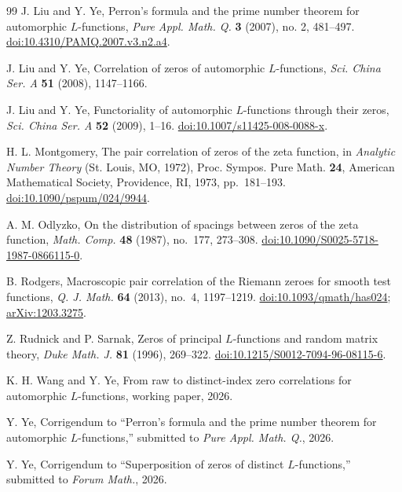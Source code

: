 \documentclass[11pt]{article}
\numberwithin{equation}{section}
\theoremstyle{remark}
\begin{document}
\begin{thebibliography}{99}
J. Liu and Y. Ye, Perron's formula and the prime number theorem for
automorphic $L$-functions, \textit{Pure Appl. Math. Q.} \textbf{3}
(2007), no. 2, 481--497.
\href{https://doi.org/10.4310/PAMQ.2007.v3.n2.a4}{doi:10.4310/PAMQ.2007.v3.n2.a4}.

J. Liu and Y. Ye, Correlation of zeros of automorphic $L$-functions,
\textit{Sci. China Ser. A} \textbf{51} (2008), 1147--1166.

J. Liu and Y. Ye, Functoriality of automorphic $L$-functions through
their zeros, \textit{Sci. China Ser. A} \textbf{52} (2009), 1--16.
\href{https://doi.org/10.1007/s11425-008-0088-x}{doi:10.1007/s11425-008-0088-x}.

H. L. Montgomery,
The pair correlation of zeros of the zeta function,
in \emph{Analytic Number Theory} (St. Louis, MO, 1972),
Proc. Sympos. Pure Math. \textbf{24},
American Mathematical Society, Providence, RI, 1973, pp.~181--193.
\href{https://doi.org/10.1090/pspum/024/9944}{doi:10.1090/pspum/024/9944}.

A. M. Odlyzko,
On the distribution of spacings between zeros of the zeta function,
\emph{Math. Comp.} \textbf{48} (1987), no.~177, 273--308.
\href{https://doi.org/10.1090/S0025-5718-1987-0866115-0}{doi:10.1090/S0025-5718-1987-0866115-0}.

B. Rodgers,
Macroscopic pair correlation of the Riemann zeroes for smooth test functions,
\emph{Q. J. Math.} \textbf{64} (2013), no.~4, 1197--1219.
\href{https://doi.org/10.1093/qmath/has024}{doi:10.1093/qmath/has024}; \href{https://arxiv.org/abs/1203.3275}{arXiv:1203.3275}.

Z. Rudnick and P. Sarnak, Zeros of principal $L$-functions and random
matrix theory, \textit{Duke Math. J.} \textbf{81} (1996), 269--322.
\href{https://doi.org/10.1215/S0012-7094-96-08115-6}{doi:10.1215/S0012-7094-96-08115-6}.

K. H. Wang and Y. Ye, From raw to distinct-index zero correlations for
automorphic $L$-functions, working paper, 2026.

Y. Ye, Corrigendum to ``Perron's formula and the prime number theorem
for automorphic $L$-functions,'' submitted to \textit{Pure Appl. Math. Q.}, 2026.

Y. Ye, Corrigendum to ``Superposition of zeros of distinct $L$-functions,''
submitted to \emph{Forum Math.}, 2026.

\end{thebibliography}
\end{document}
